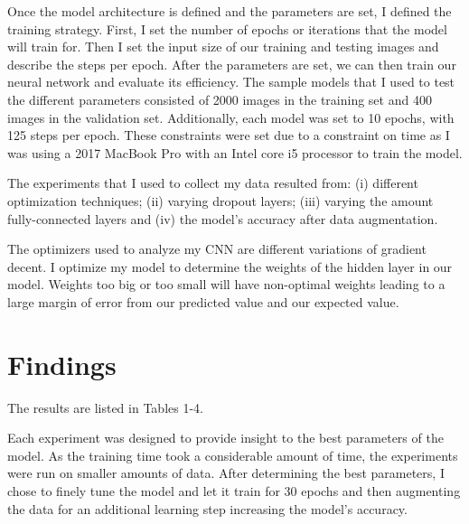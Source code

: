 \documentclass[12pt,english]{article}
\begin{document}
Once the model architecture is defined and the parameters are set, I defined the training strategy. First, I set the number of epochs or iterations that the model will train for. Then I set the input size of our training and testing images and describe the steps per epoch. After the parameters are set, we can then train our neural network and evaluate its efficiency. 
The sample models that I used to test the different parameters consisted of 2000 images in the training set and 400 images in the validation set. Additionally, each model was set to 10 epochs, with 125 steps per epoch. These constraints were set due to a constraint on time as I was using a 2017 MacBook Pro with an Intel core i5 processor to train the model. \par

The experiments that I used to collect my data resulted from: (i) different optimization techniques; (ii) varying dropout layers; (iii) varying the amount fully-connected layers and (iv) the model’s accuracy after data augmentation.\par

The optimizers used to analyze my CNN are different variations of gradient decent. I optimize my model to determine the weights of the hidden layer in our model. Weights too big or too small will have non-optimal weights leading to a large margin of error from our predicted value and our expected value. 

\section{Findings}
The results are listed in Tables 1-4. \par
Each experiment was designed to provide insight to the best parameters of the model. As the training time took a considerable amount of time, the experiments were run on smaller amounts of data. After determining the best parameters, I chose to finely tune the model and let it train for 30 epochs and then augmenting the data for an additional learning step increasing the model’s accuracy. \par
\end{document}
